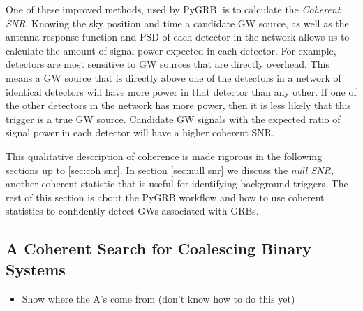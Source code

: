 \documentclass[11pt]{cuthesis}
\begin{document}
One of these improved methods, used by PyGRB, is to calculate the \textit{Coherent SNR}. Knowing the sky position and time a candidate GW source, as well as the antenna response function and PSD of each detector in the network allows us to calculate the amount of signal power expected in each detector. For example, detectors are most sensitive to GW sources that are directly overhead. This means a GW source that is directly above one of the detectors in a network of identical detectors will have more power in that detector than any other. If one of the other detectors in the network has more power, then it is less likely that this trigger is a true GW source. Candidate GW signals with the expected ratio of signal power in each detector will have a higher coherent SNR. 

This qualitative description of coherence is made rigorous in the following sections up to \ref{sec:coh snr}. In section \ref{sec:null snr} we discuss the \textit{null SNR}, another coherent statistic that is useful for identifying background triggers. The rest of this section is about the PyGRB workflow and how to use coherent statistics to confidently detect GWs associated with GRBs. 

\subsection{A Coherent Search for Coalescing Binary Systems}
\begin{itemize}
\item Show where the A's come from (don't know how to do this yet)
\end{itemize}
\end{document}
